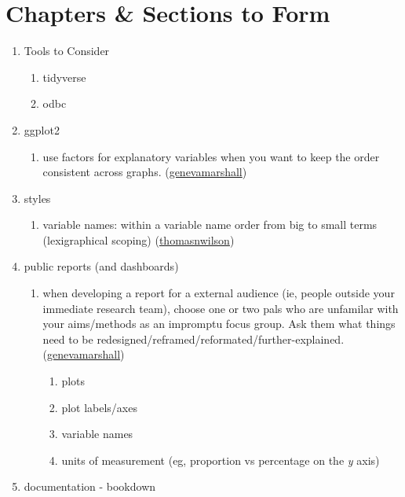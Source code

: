 \documentclass[]{book}
\providecommand{\tightlist}{%
  \setlength{\itemsep}{0pt}\setlength{\parskip}{0pt}}
\begin{document}
\hypertarget{chapters-sections-to-form}{%
\section{Chapters \& Sections to Form}\label{chapters-sections-to-form}}

\begin{enumerate}
\def\labelenumi{\arabic{enumi}.}
\tightlist
\item
  Tools to Consider

  \begin{enumerate}
  \def\labelenumii{\arabic{enumii}.}
  \tightlist
  \item
    tidyverse
  \item
    odbc
  \end{enumerate}
\item
  ggplot2

  \begin{enumerate}
  \def\labelenumii{\arabic{enumii}.}
  \tightlist
  \item
    use factors for explanatory variables when you want to keep the order consistent across graphs. (\href{https://github.com/genevamarshall}{genevamarshall})
  \end{enumerate}
\item
  styles

  \begin{enumerate}
  \def\labelenumii{\arabic{enumii}.}
  \tightlist
  \item
    variable names: within a variable name order from big to small terms (lexigraphical scoping) (\href{https://github.com/thomasnwilson}{thomasnwilson})
  \end{enumerate}
\item
  public reports (and dashboards)

  \begin{enumerate}
  \def\labelenumii{\arabic{enumii}.}
  \tightlist
  \item
    when developing a report for a external audience (ie, people outside your immediate research team), choose one or two pals who are unfamilar with your aims/methods as an impromptu focus group. Ask them what things need to be redesigned/reframed/reformated/further-explained. (\href{https://github.com/genevamarshall}{genevamarshall})

    \begin{enumerate}
    \def\labelenumiii{\arabic{enumiii}.}
    \tightlist
    \item
      plots
    \item
      plot labels/axes
    \item
      variable names
    \item
      units of measurement (eg, proportion vs percentage on the \emph{y} axis)
    \end{enumerate}
  \end{enumerate}
\item
  documentation - bookdown
\end{enumerate}
\end{document}
